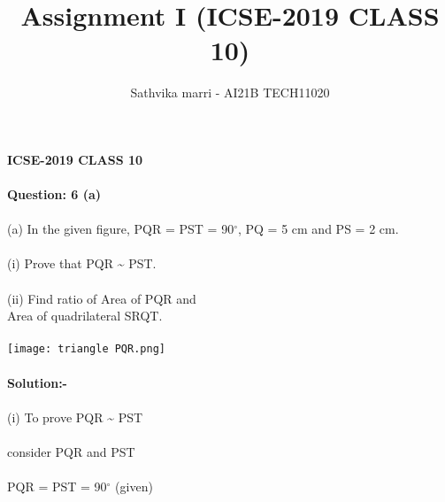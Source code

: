 \documentclass[a4paper,12pt,two column]{article}
\begin{document}
{\title{Assignment I (ICSE-2019 CLASS 10)}}
{\author{Sathvika marri - AI21B TECH11020}}

\maketitle
\textbf{{ICSE-2019 CLASS 10}}\\\\
\textbf{Question: 6 (a)}\\\\
(a) In the given figure, \angle PQR = \angle PST = 90$^{\circ}$, PQ = 5 cm and PS = 2 cm.\\\\
(i) Prove that \triangle PQR \hspace{0.1cm} \sim \hspace{0.1cm}  \triangle PST.\\\\
(ii) Find \hspace{0.1cm} ratio \hspace{0.1cm} of \hspace{0.1cm} Area \hspace{0.1cm} of \triangle PQR \hspace{0.1cm} and\hspace{0.1cm}\\
Area \hspace{0.1cm}  of \hspace{0.1cm} quadrilateral \hspace{0.1cm} SRQT.\\\\
\texttt{[image: triangle PQR.png]}\\\\
\textbf{Solution:- }\\\\
(i)\hspace{0.1cm}  To \hspace{0.2cm} prove \hspace{0.2cm} \triangle PQR \hspace{0.1cm} \sim \hspace{0.1cm} \triangle PST\\\\
consider \hspace{0.1cm}  \triangle PQR \hspace{0.2cm} and \hspace{0.2cm} \triangle PST\\\\
\angle PQR = \angle PST \hspace{0.1cm} = 90$^{\circ}$ \hspace{0.1cm} (given)\\\\
\end{document}
